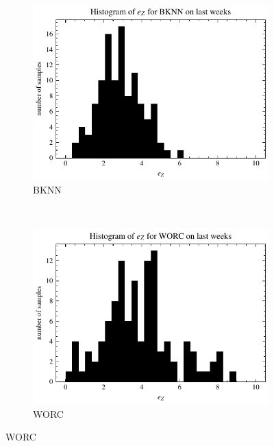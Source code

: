 \begin{figure}[ht]
    \centering
    \begin{subfigure}[t]{0.5\textwidth}
        \centering
        \includegraphics[width=\textwidth]{chapters/figures/result_histograms/result_histogram_last_weeks_zone_sum_error_BKNN.pdf}
        \captionsetup{width=.9\linewidth}
        \caption{BKNN}
    \end{subfigure}%
    ~ 
    \begin{subfigure}[t]{0.5\textwidth}
        \centering
        \includegraphics[width=\textwidth]{chapters/figures/result_histograms/result_histogram_last_weeks_zone_sum_error_WORC.pdf}
        \captionsetup{width=.9\linewidth}
        \caption{WORC}
    \end{subfigure}

\end{figure}
